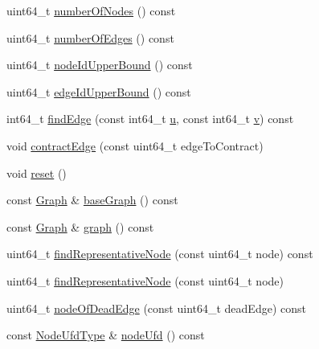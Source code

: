 \begin{DoxyCompactItemize}
uint64\+\_\+t \hyperlink{classnifty_1_1graph_1_1EdgeContractionGraph_a908385c94499ae9394bb23c52a584e72}{number\+Of\+Nodes} () const 
\item 
uint64\+\_\+t \hyperlink{classnifty_1_1graph_1_1EdgeContractionGraph_aebdf2c843a1b95436ecf1493bfab6df9}{number\+Of\+Edges} () const 
\item 
uint64\+\_\+t \hyperlink{classnifty_1_1graph_1_1EdgeContractionGraph_afe4ec2d07dd10fb5ba350e43079186a5}{node\+Id\+Upper\+Bound} () const 
\item 
uint64\+\_\+t \hyperlink{classnifty_1_1graph_1_1EdgeContractionGraph_a1d67de79a99520219a2090efdfabfc66}{edge\+Id\+Upper\+Bound} () const 
\item 
int64\+\_\+t \hyperlink{classnifty_1_1graph_1_1EdgeContractionGraph_ad1d8517ee863c267cefb63dd60fb37c1}{find\+Edge} (const int64\+\_\+t \hyperlink{classnifty_1_1graph_1_1EdgeContractionGraph_a4d0519610b822ff3842b8baa3b5a2580}{u}, const int64\+\_\+t \hyperlink{classnifty_1_1graph_1_1EdgeContractionGraph_a0b321bb637fd8291985e8cecf3f87fc9}{v}) const 
\item 
void \hyperlink{classnifty_1_1graph_1_1EdgeContractionGraph_ad13498d6f4fd9e360fa8884febaeba0a}{contract\+Edge} (const uint64\+\_\+t edge\+To\+Contract)
\item 
void \hyperlink{classnifty_1_1graph_1_1EdgeContractionGraph_a76a6e084c4dfe14a20f5671ec5f57cbc}{reset} ()
\item 
const \hyperlink{classnifty_1_1graph_1_1EdgeContractionGraph_a22f00237e657f393dfcaacdc10de9bba}{Graph} \& \hyperlink{classnifty_1_1graph_1_1EdgeContractionGraph_ae75c47ed3517a8695b0eb0852c5ab888}{base\+Graph} () const 
\item 
const \hyperlink{classnifty_1_1graph_1_1EdgeContractionGraph_a22f00237e657f393dfcaacdc10de9bba}{Graph} \& \hyperlink{classnifty_1_1graph_1_1EdgeContractionGraph_ae22624b7cd920b353a4a6a42bb3603c5}{graph} () const 
\item 
uint64\+\_\+t \hyperlink{classnifty_1_1graph_1_1EdgeContractionGraph_a934c568562bbcd179f198f5c67ff7bf4}{find\+Representative\+Node} (const uint64\+\_\+t node) const 
\item 
uint64\+\_\+t \hyperlink{classnifty_1_1graph_1_1EdgeContractionGraph_a96db6fdacf91e9f67d505f1bfc33ef76}{find\+Representative\+Node} (const uint64\+\_\+t node)
\item 
uint64\+\_\+t \hyperlink{classnifty_1_1graph_1_1EdgeContractionGraph_adcf3984a735ed9f44978078264dc4fdd}{node\+Of\+Dead\+Edge} (const uint64\+\_\+t dead\+Edge) const 
\item 
const \hyperlink{classnifty_1_1graph_1_1EdgeContractionGraph_a7ff98238621f4b534e89b1880ee77239}{Node\+Ufd\+Type} \& \hyperlink{classnifty_1_1graph_1_1EdgeContractionGraph_a2d7d6984f84e00c2338ef28c971b6bb3}{node\+Ufd} () const 
\end{DoxyCompactItemize}


